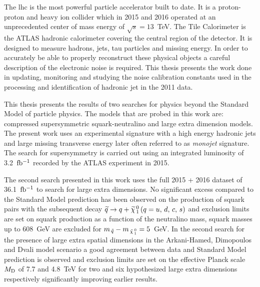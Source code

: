 The \gls{lhc} is the most powerful particle accelerator built to date. It is a
proton-proton and heavy ion collider which in 2015 and 2016 operated at an
unprecedented center of mass energy of $\sqrt{s} = 13$~TeV. The Tile Calorimeter
is the ATLAS hadronic calorimeter covering the central region of the
detector. It is designed to measure hadrons, jets, tau particles and missing
energy. In order to accurately be able to properly reconstruct these physical
objects a careful description of the electronic noise is required. This thesis
presents the work done in updating, monitoring and studying the noise
calibration constants used in the processing and identification of hadronic jet
in the 2011 data.

This thesis presents the results of two searches for physics beyond the Standard
Model of particle physics. The models that are probed in this work are:
compressed supersymmetric squark-neutralino and large extra dimension
models. The present work uses an experimental signature with a high energy
hadronic jets and large missing transverse energy later often referred to as
\emph{monojet} signature. The search for supersymmetry is carried out using an
integrated luminosity of 3.2~$\mbox{fb$^{-1}$}$ recorded by the ATLAS experiment in 2015.


The second search presented in this work uses the full 2015 + 2016 dataset of
36.1~$\mbox{fb$^{-1}$}$ to search for large extra dimensions. No significant excess compared
to the Standard Model prediction has been observed on the production of squark
pairs with the subsequent decay $\widetilde{q} \rightarrow q + \widetilde{\chi}_{\, 1}^{\, 0}\, (q = u,\, d,\, c,\, s)$ and exclusion limits are set on
squark production as a function of the neutralino mass, squark masses up to
608~GeV are excluded for $m_{\, \tilde{q}} - m_{\, \tilde{\chi}_{\, 1}^{\, 0}} = 5$~GeV. In the second search
for the presence of large extra spatial dimensions in the Arkani-Hamed,
Dimopoulos and Dvali model scenario a good agreement between data and Standard
Model prediction is observed and exclusion limits are set on the effective
Planck scale $M_\mathrm{D}$ of 7.7 and 4.8~TeV for two and six hypothesized large extra
dimensions respectively significantly improving earlier results.
